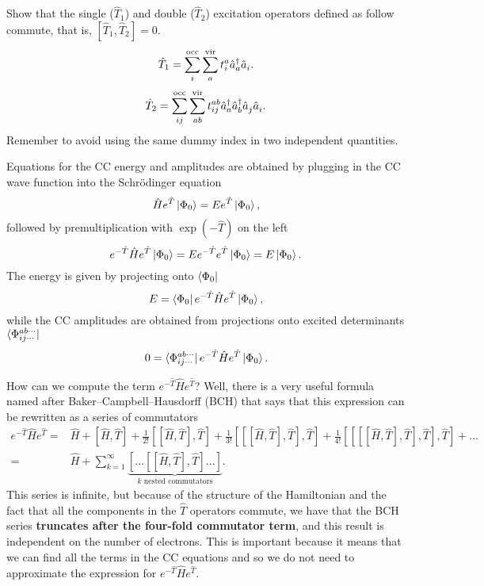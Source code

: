 \documentclass[../Main/chem532-notes.tex]{subfiles}
\begin{document}
\begin{problem}
Show that the single ($\hat{T}_1$) and double ($\hat{T}_2$) excitation operators defined as follow commute, that is, $[\hat{T}_1, \hat{T}_2] = 0$. 
\begin{equation}
\hat{T}_1 = \sum_{i}^{\mathrm{occ}} \sum_{a}^{\mathrm{vir}} t_{i}^{a} \hat{a}_{a}^{\dagger} \hat{a}_{i}^{\,}.
\end{equation}
\begin{equation}
\hat{T}_2 = \sum_{ij}^{\mathrm{occ}} \sum_{ab}^{\mathrm{vir}} t_{ij}^{ab} \hat{a}_{a}^{\dagger}\hat{a}_{b}^{\dagger} \hat{a}_{j}^{\,}\hat{a}_{i}^{\,}.
\end{equation}
Remember to avoid using the same dummy index in two independent quantities.
\end{problem}


Equations for the CC energy and amplitudes are obtained by plugging in the CC wave function into the Schr\"{o}dinger equation
\begin{equation}
\hat{H} e^{\hat{T}} \ket{\Phi_0} = E e^{\hat{T}} \ket{\Phi_0},
\end{equation}
followed by premultiplication with $\exp(-\hat{T})$ on the left
\begin{equation}
e^{-\hat{T} } \hat{H} e^{\hat{T} }\ket{\Phi_0} = E e^{-\hat{T} }e^{\hat{T}} \ket{\Phi_0} = E \ket{\Phi_0}.
\end{equation}
The energy is given by projecting onto $\bra{\Phi_0}$
\begin{equation}
E = \bra{\Phi_0} e^{-\hat{T} } \hat{H} e^{\hat{T} }\ket{\Phi_0},
\end{equation}
while the CC amplitudes are obtained from projections onto excited determinants $\bra{\Phi_{ij\cdots}^{ab\cdots}}$
\begin{equation}
0 = \bra{\Phi_{ij\cdots}^{ab\cdots}} e^{-\hat{T} } \hat{H} e^{\hat{T} }\ket{\Phi_0}.
\end{equation}

How can we compute the term $e^{-\hat{T} } \hat{H} e^{\hat{T} }$? Well, there is a very useful formula named after Baker--Campbell--Hausdorff (BCH) that says that this expression can be rewritten as a series of commutators
\begin{equation}
\begin{split}
e^{-\hat{T} } \hat{H} e^{\hat{T} } = &
\hat{H} + [\hat{H},\hat{T}] + \frac{1}{2!} [[\hat{H},\hat{T}],\hat{T}] + 
 \frac{1}{3!} [[[\hat{H},\hat{T}],\hat{T}],\hat{T}] +
  \frac{1}{4!} [[[[\hat{H},\hat{T}],\hat{T}],\hat{T}],\hat{T}]  + \ldots \\
  = & \hat{H} + \sum_{k=1}^\infty \underbrace{[\ldots[[\hat{H},\hat{T}],\hat{T}] \ldots ]}_{k\text{ nested commutators}}.
\end{split}  
\end{equation}
This series is infinite, but because of the structure of the Hamiltonian and the fact that all the components in the $\hat{T}$ operators commute, we have that the BCH series \textbf{truncates after the four-fold commutator term}, and this result is independent on the number of electrons.
This is important because it means that we can find all the terms in the CC equations and so we do not need to approximate the expression for $e^{-\hat{T} } \hat{H} e^{\hat{T} }$.
\end{document}
